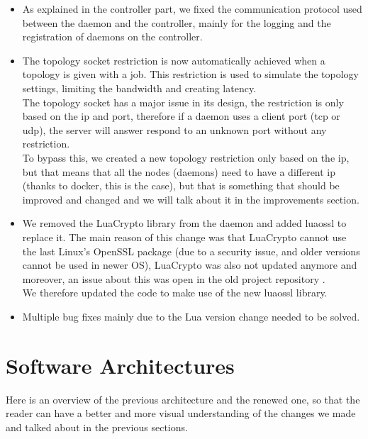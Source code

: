 \documentclass{eplmastersthesis}
\begin{document}
        \begin{itemize}
          \item As explained in the controller part, we fixed the communication
          protocol used between the daemon and the controller, mainly for
          the logging and the registration of daemons on the controller.
          \item The topology socket restriction is now automatically achieved
          when a topology is given with a job. This restriction is used to
          simulate the topology settings, limiting the bandwidth and creating
          latency.\\
          The topology socket has a major issue in its design, the restriction
          is only based on the ip and port, therefore if a daemon uses a client
          port (tcp or udp), the server will answer respond to an unknown port
          without any restriction.\\
          To bypass this, we created a new topology restriction only based on
          the ip, but that means that all the nodes (daemons) need to have a
          different ip (thanks to docker, this is the case), but that is
          something that should be improved and changed and we will talk about
          it in the improvements section.
          \item We removed the LuaCrypto library from the daemon and added
          luaossl to replace it. The main reason of this change was that
          LuaCrypto cannot use the last Linux's OpenSSL package (due to a
          security issue, and older versions cannot be used in newer OS),
          LuaCrypto was also not updated anymore and moreover, an issue about
          this was open in the old project repository \cite{sslLib}.\\
          We therefore updated the code to make use of the new luaossl library.
          \item Multiple bug fixes mainly due to the Lua version change needed
          to be solved.
        \end{itemize}

    \section{Software Architectures}

      Here is an overview of the previous architecture and the renewed one,
      so that the reader can have a better and more visual understanding
      of the changes we made and talked about in the previous sections.
\end{document}
